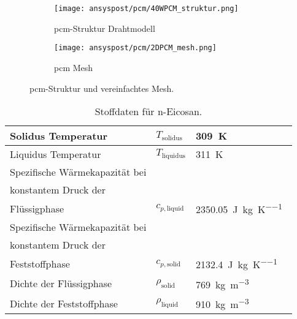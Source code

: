 \begin{figure}[!htb]
    \centering
    \begin{subfigure}[t]{0.7\textwidth}
        \centering
        \texttt{[image: ansyspost/pcm/40WPCM\_struktur.png]}
        \caption{\acs{pcm}-Struktur Drahtmodell}\label{fig:pcm_struktur}
    \end{subfigure}
    \hfill
    \begin{subfigure}[t]{0.15\textwidth}
        \centering
        \texttt{[image: ansyspost/pcm/2DPCM\_mesh.png]}
        \caption{\ac{pcm} Mesh}\label{fig:pcm_mesh}
    \end{subfigure}
    \caption{\acs{pcm}-Struktur und vereinfachtes Mesh.}\label{fig:pcm_geometrien}
\end{figure}

\begin{table}[H]

  \centering
  \caption{Stoffdaten für n-Eicosan.}\label{tab:eicosane_data}

  \begin{tabular}{lll}

    \toprule[1pt]
    Solidus Temperatur & $T_{\text{solidus}}$ & \SI{309}{\kelvin}~\cite{NIST} \\

    \midrule[0.5pt]
    Liquidus Temperatur & $T_{\text{liquidus}}$ & \SI{311}{\kelvin}~\cite{NIST} \\

    \midrule[0.5pt]
    Spezifische Wärmekapazität bei\\konstantem Druck der\\Flüssigphase & $c_{p,\text{liquid}}$ & \SI{2350,05}{\joule\per\kilogram\per\kelvin}~\cite{NIST} \\

    \midrule[0.5pt]
    Spezifische Wärmekapazität bei\\konstantem Druck der\\Feststoffphase & $c_{p,\text{solid}}$ & \SI{2132,4}{\joule\per\kilogram\per\kelvin}~\cite{NIST} \\

    \midrule[0.5pt]
    Dichte der Flüssigphase & $\rho_{\text{solid}}$ & \SI{769}{\kilogram\per\cubic\meter}~\cite{Nazarychev-2022} \\

    \midrule[0.5pt]
    Dichte der Feststoffphase & $\rho_{\text{liquid}}$ & \SI{910}{\kilogram\per\cubic\meter}~\cite{Nazarychev-2022} \\


\end{tabular}
\end{table}
